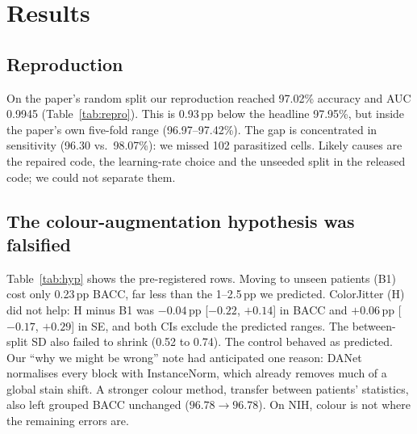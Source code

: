 \documentclass[conference]{IEEEtran}
\newcommand{\pp}{\,pp}
\begin{document}
\section{Results}

\subsection{Reproduction}
\label{sec:repro}
On the paper's random split our reproduction reached 97.02\% accuracy and AUC 0.9945 (Table~\ref{tab:repro}). This is 0.93\pp{} below the headline 97.95\%, but inside the paper's own five-fold range (96.97--97.42\%). The gap is concentrated in sensitivity (96.30 vs.\ 98.07\%): we missed 102 parasitized cells. Likely causes are the repaired code, the learning-rate choice and the unseeded split in the released code; we could not separate them.

\begin{table}[t]
\caption{DANet reproduction on the NIH random split}
\label{tab:repro}
\centering
\footnotesize
\setlength{\tabcolsep}{3pt}
\end{table}

\subsection{The colour-augmentation hypothesis was falsified}
\label{sec:hyp}
Table~\ref{tab:hyp} shows the pre-registered rows. Moving to unseen patients (B1) cost only 0.23\pp{} BACC, far less than the 1--2.5\pp{} we predicted. ColorJitter (H) did not help: H minus B1 was $-0.04$\pp{} [$-0.22$, $+0.14$] in BACC and $+0.06$\pp{} [$-0.17$, $+0.29$] in SE, and both CIs exclude the predicted ranges. The between-split SD also failed to shrink (0.52 to 0.74). The control behaved as predicted. Our ``why we might be wrong'' note had anticipated one reason: DANet normalises every block with InstanceNorm, which already removes much of a global stain shift. A stronger colour method, transfer between patients' statistics, also left grouped BACC unchanged ($96.78 \to 96.78$). On NIH, colour is not where the remaining errors are.
\end{document}
